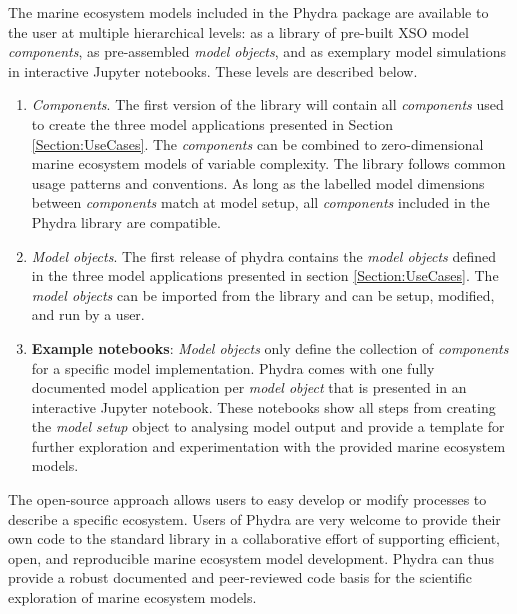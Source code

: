 \documentclass[journal abbreviation, manuscript]{copernicus}
\begin{document}
The marine ecosystem models included in the Phydra package are available to the user at multiple hierarchical levels: as a library of pre-built XSO model \textit{components}, as pre-assembled \textit{model objects}, and as exemplary model simulations in interactive Jupyter notebooks. These levels are described below.

\begin{enumerate}
    \item \textit{Components}. The first version of the library will contain all \textit{components} used to create the three model applications presented in Section \ref{Section:UseCases}. The \textit{components} can be combined to zero-dimensional marine ecosystem models of variable complexity. The library follows common usage patterns and conventions. As long as the labelled model dimensions between \textit{components} match at model setup, all \textit{components} included in the Phydra library are compatible.
    
    \item \textit{Model objects}. The first release of phydra contains the \textit{model objects} defined in the three model applications presented in section \ref{Section:UseCases}. The \textit{model objects} can be imported from the library and can be setup, modified, and run by a user.
    
    \item \textbf{Example notebooks}: \textit{Model objects} only define the collection of \textit{components} for a specific model implementation. Phydra comes with one fully documented model application per \textit{model object} that is presented in an interactive Jupyter notebook. These notebooks show all steps from creating the \textit{model setup} object to analysing model output and provide a template for further exploration and experimentation with the provided marine ecosystem models.
    
\end{enumerate}

The open-source approach allows users to easy develop or modify processes to describe a specific ecosystem. Users of Phydra are very welcome to provide their own code to the standard library in a collaborative effort of supporting efficient, open, and reproducible marine ecosystem model development. Phydra can thus provide a robust documented and peer-reviewed code basis for the scientific exploration of marine ecosystem models.
\end{document}

